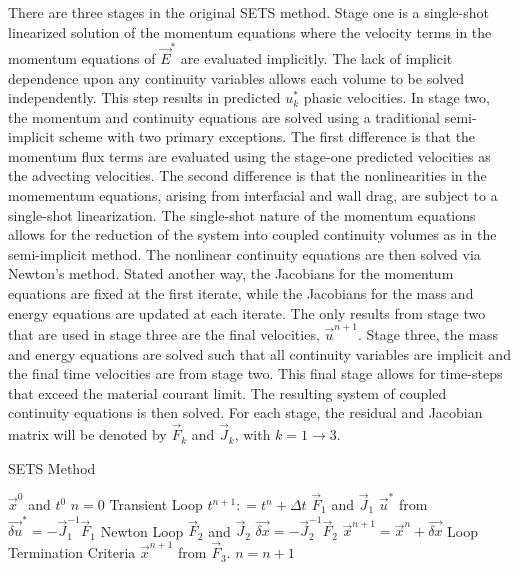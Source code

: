 There are three stages in the original SETS method.
Stage one is a single-shot linearized solution of the momentum equations where the velocity terms in the momentum equations of $\vec{E}^{*}$ are evaluated implicitly.
The lack of implicit dependence upon any continuity variables allows each volume to be solved independently.
This step results in predicted $u^{*}_{k}$ phasic velocities.
In stage two, the momentum and continuity equations are solved using a traditional semi-implicit scheme with two primary exceptions.
The first difference is that the momentum flux terms are evaluated using the stage-one predicted velocities as the advecting velocities.
The second difference is that the nonlinearities in the momementum equations, arising from interfacial and wall drag, are subject to a single-shot linearization.
The single-shot nature of the momentum equations allows for the reduction of the system into coupled continuity volumes as in the semi-implicit method.
The nonlinear continuity equations are then solved via Newton's method.
Stated another way, the Jacobians for the momentum equations are fixed at the first iterate, while the Jacobians for the mass and energy equations are updated at each iterate.
The only results from stage two that are used in stage three are the final velocities, $\vec{u}^{n+1}$.
Stage three, the mass and energy equations are solved such that all continuity variables are implicit and the final time velocities are from stage two.
This final stage allows for time-steps that exceed the material courant limit.
The resulting system of coupled continuity equations is then solved.
For each stage, the residual and Jacobian matrix will be denoted by $\vec{F}_k$ and $\vec{J}_k$, with $k = 1 \to 3$.

\begin{algo}[H]
\caption{SETS Method}
\label{alg:sets}
\setlength{\baselineskip}{0.625\baselineskip}
\begin{algorithmic}[1]
\Require $\vec{x}^{0}$ and $t^{0}$
\Set $n = 0$
\Loop \; Transient Loop
    \State $t^{n+1} : = t^{n} + \Delta t$
	\Calculate $\vec{F}_1$ and $\vec{J}_1$
	\Calculate $\vec{u}^{*}$ from $\vec{\delta u}^{*} = -\vec{J}^{-1}_1\vec{F}_1$
	\Loop \; Newton Loop
		\Calculate $\vec{F}_2$ and $\vec{J}_2$
		\BlackBox $\vec{\delta x} = - \vec{J}_2^{-1}\vec{F}_2$
		\Calculate $\vec{x}^{n+1} = \vec{x}^{n} + \vec{\delta x}$
		\BlackBox Loop Termination Criteria
	\EndLoop
	\Calculate $\vec{x}^{n+1}$ from $\vec{F}_3$.
	\State $n = n + 1$
\EndLoop
\end{algorithmic}
\end{algo}

